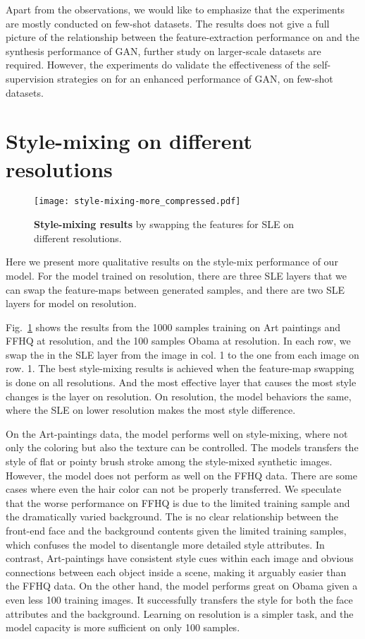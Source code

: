 \documentclass{article} \usepackage{iclr2021_conference,times}
\begin{document}
Apart from the observations, we would like to emphasize that the experiments are mostly conducted on few-shot datasets. The results does not give a full picture of the relationship between the feature-extraction performance on  and the synthesis performance of GAN, further study on larger-scale datasets are required. However, the experiments do validate the effectiveness of the self-supervision strategies on  for an enhanced performance of GAN, on few-shot datasets. 


\section{Style-mixing on different resolutions}

\begin{figure}[h]
\vspace{-2mm}
\centering
\texttt{[image: style-mixing-more\_compressed.pdf]}
\caption{\textbf{Style-mixing results} by swapping the features for SLE on different resolutions.}
\label{fig:style-mixing-multilayer}
\end{figure}

Here we present more qualitative results on the style-mix performance of our model. For the model trained on  resolution, there are three SLE layers that we can swap the feature-maps between generated samples, and there are two SLE layers for model on  resolution. 

Fig.~\ref{fig:style-mixing-multilayer} shows the results from the 1000 samples training on Art paintings and FFHQ at  resolution, and the 100 samples Obama at  resolution. In each row, we swap the  in the SLE layer from the image in col. 1 to the one from each image on row. 1. The best style-mixing results is achieved when the feature-map swapping is done on all resolutions. And the most effective layer that causes the most style changes is the layer on  resolution. On  resolution, the model behaviors the same, where the SLE on lower resolution makes the most style difference.

On the Art-paintings data, the model performs well on style-mixing, where not only the coloring but also the texture can be controlled. The models transfers the style of flat or pointy brush stroke among the style-mixed synthetic images. However, the model does not perform as well on the FFHQ data. There are some cases where even the hair color can not be properly transferred. We speculate that the worse performance on FFHQ is due to the limited training sample and the dramatically varied background. The is no clear relationship between the front-end face and the background contents given the limited training samples, which confuses the model to disentangle more detailed style attributes. In contrast, Art-paintings have consistent style cues within each image and obvious connections between each object inside a scene, making it arguably easier than the FFHQ data. On the other hand, the model performs great on Obama given a even less 100 training images. It successfully transfers the style for both the face attributes and the background. Learning on  resolution is a simpler task, and the model capacity is more sufficient on only 100 samples.  
\end{document}
